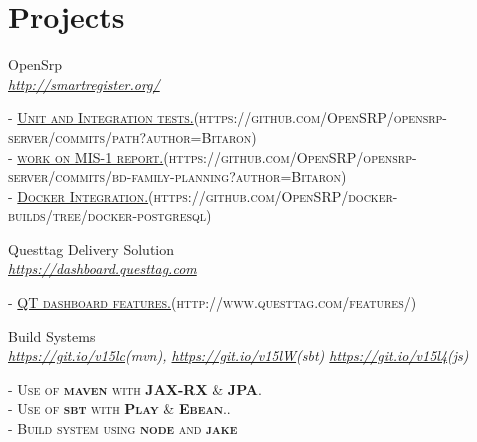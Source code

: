 \documentclass[10pt]{article} %
\begin{document}
{\begin{minipage}[t]{0.5\textwidth}

\section{Projects} 



{\raggedright\large OpenSrp\\
\textit{\href{http://smartregister.org/}{http://smartregister.org/}}\\[2pt]
}

\textsc{- \href{https://github.com/OpenSRP/opensrp-server/commits/path?author=Bitaron}{Unit and Integration tests.}(https://github.com/OpenSRP/opensrp-server/commits/path?author=Bitaron)}\\
\textsc{- \href{https://github.com/OpenSRP/opensrp-server/commits/bd-family-planning?author=Bitaron}{work on MIS-1 report.}(https://github.com/OpenSRP/opensrp-server/commits/bd-family-planning?author=Bitaron)}\\
\textsc{- \href{https://github.com/OpenSRP/docker-builds/tree/docker-postgresql}{Docker Integration.}(https://github.com/OpenSRP/docker-builds/tree/docker-postgresql)}\\





{\raggedright\large Questtag Delivery Solution\\
\textit{\href{https://dashboard.questtag.com}{https://dashboard.questtag.com}}\\[2pt]
}

\textsc{- \href{http://www.questtag.com/features/}{QT dashboard features.}(http://www.questtag.com/features/)}\\




{\raggedright\large Build Systems \\
	\textit{\href {https://github.com/Bitaron/java-maven}{https://git.io/v15lc}(mvn), \href{https://github.com/Bitaron/java-sbt}{https://git.io/v15lW}(sbt)
		\href{https://github.com/Bitaron/js}{https://git.io/v15l4}(js)}\\[5pt]}
\textsc{- Use of \textbf{maven} with \textbf{JAX-RX} \& \textbf{JPA}. }\\
\textsc{- Use of \textbf{sbt} with \textbf{Play} \& \textbf{Ebean}..}\\
\textsc{- Build system using \textbf{node} and \textbf{jake}}\\
\normalsize{}\\




\end{minipage}}
\end{document}
